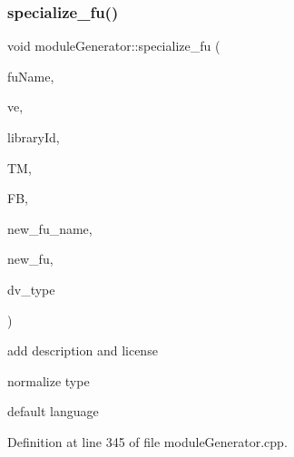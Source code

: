 \subsubsection{\texorpdfstring{specialize\+\_\+fu()}{specialize\_fu()}}
{\footnotesize\ttfamily void module\+Generator\+::specialize\+\_\+fu (\begin{DoxyParamCaption}\item[{std\+::string}]{fu\+Name,  }\item[{\hyperlink{graph_8hpp_abefdcf0544e601805af44eca032cca14}{vertex}}]{ve,  }\item[{std\+::string}]{library\+Id,  }\item[{const \hyperlink{technology__manager_8hpp_a4b9ecd440c804109c962654f9227244e}{technology\+\_\+manager\+Ref}}]{TM,  }\item[{const \hyperlink{function__behavior_8hpp_a94872da12ed056b6ecf90456164e0213}{Function\+Behavior\+Const\+Ref}}]{FB,  }\item[{std\+::string}]{new\+\_\+fu\+\_\+name,  }\item[{std\+::map$<$ std\+::string, \hyperlink{technology__node_8hpp_a33dd193b7bd6b987bf0d8a770a819fa7}{technology\+\_\+node\+Ref} $>$ \&}]{new\+\_\+fu,  }\item[{const \hyperlink{target__device_8hpp_a476becc690220f0805ce73006449c732}{Target\+Device\+\_\+\+Type}}]{dv\+\_\+type }\end{DoxyParamCaption})}

add description and license

normalize type

default language 

Definition at line 345 of file module\+Generator.\+cpp.



